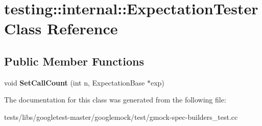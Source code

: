 \hypertarget{classtesting_1_1internal_1_1ExpectationTester}{}\section{testing\+:\+:internal\+:\+:Expectation\+Tester Class Reference}
\label{classtesting_1_1internal_1_1ExpectationTester}
\subsection*{Public Member Functions}
\begin{DoxyCompactItemize}
\item 
\mbox{\label{classtesting_1_1internal_1_1ExpectationTester_af5d762355ef83f414c4b0fc14c8fc943}} 
void {\bfseries Set\+Call\+Count} (int n, Expectation\+Base $\ast$exp)
\end{DoxyCompactItemize}


The documentation for this class was generated from the following file\+:\begin{DoxyCompactItemize}
\item 
tests/libs/googletest-\/master/googlemock/test/gmock-\/spec-\/builders\+\_\+test.\+cc\end{DoxyCompactItemize}
